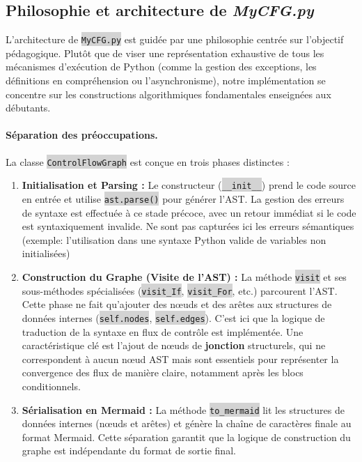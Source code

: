 \documentclass[11pt,a4paper]{article}
\newcommand{\code}[1]{\colorbox{lightgray}{\texttt{\small #1}}}
\begin{document}
\subsection{Philosophie et architecture de \textit{MyCFG.py}}

L'architecture de \code{MyCFG.py} est guidée par une philosophie centrée sur l'objectif pédagogique. Plutôt que de viser une représentation exhaustive de tous les mécanismes d'exécution de Python (comme la gestion des exceptions, les définitions en compréhension ou l'asynchronisme), notre implémentation se concentre sur les constructions algorithmiques fondamentales enseignées aux débutants.

\paragraph{Séparation des préoccupations.} La classe \code{ControlFlowGraph} est conçue en trois phases distinctes :
\begin{enumerate}
    \item \textbf{Initialisation et Parsing :} Le constructeur (\code{\_\_init\_\_}) prend le code source en entrée et utilise \code{ast.parse()} pour générer l'AST. La gestion des erreurs de syntaxe est effectuée à ce stade précoce, avec un retour immédiat si le code est syntaxiquement invalide. Ne sont pas capturées ici les erreurs sémantiques (exemple: l'utilisation dans une syntaxe Python valide de variables non initialisées)
    \item \textbf{Construction du Graphe (Visite de l'AST) :} La méthode \code{visit} et ses sous-méthodes spécialisées (\code{visit\_If}, \code{visit\_For}, etc.) parcourent l'AST. Cette phase ne fait qu'ajouter des nœuds et des arêtes aux structures de données internes (\code{self.nodes}, \code{self.edges}). C'est ici que la logique de traduction de la syntaxe en flux de contrôle est implémentée. Une caractéristique clé est l'ajout de nœuds de \textbf{jonction} structurels, qui ne correspondent à aucun nœud AST mais sont essentiels pour représenter la convergence des flux de manière claire, notamment après les blocs conditionnels.
    \item \textbf{Sérialisation en Mermaid :} La méthode \code{to\_mermaid} lit les structures de données internes (nœuds et arêtes) et génère la chaîne de caractères finale au format Mermaid. Cette séparation garantit que la logique de construction du graphe est indépendante du format de sortie final.
\end{enumerate}
\end{document}
